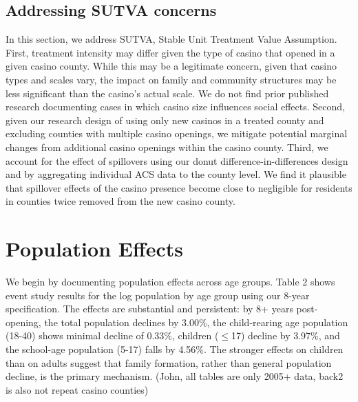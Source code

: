 \documentclass[12pt]{article}
\begin{document}
 
 
 \subsection{Addressing SUTVA concerns}
 In this section, we address SUTVA, Stable Unit Treatment Value Assumption. First, treatment intensity may differ given the type of casino that opened in a given casino county. While this may be a legitimate concern, given that casino types and scales vary, the impact on family and community structures may be less significant than the casino's actual scale. We do not find prior published research documenting cases in which casino size influences social effects. Second, given our research design of using only new casinos in a treated county and excluding counties with multiple casino openings, we mitigate potential marginal changes from additional casino openings within the casino county. Third, we account for the effect of spillovers using our donut difference-in-differences design and by aggregating individual ACS data to the county level. We find it plausible that spillover effects of the casino presence become close to negligible for residents in counties twice removed from the new casino county.  
 

\section{Population Effects}

We begin by documenting population effects across age groups. Table 2 shows event study results for the log population by age group using our 8-year specification. The effects are substantial and persistent: by 8+ years post-opening, the total population declines by 3.00\%, the child-rearing age population (18-40) shows minimal decline of 0.33\%, children ($\le$17) decline by 3.97\%, and the school-age population (5-17) falls by 4.56\%. The stronger effects on children than on adults suggest that family formation, rather than general population decline, is the primary mechanism. (John, all tables are only 2005+ data, back2 is also not repeat casino counties) 







\end{document}
